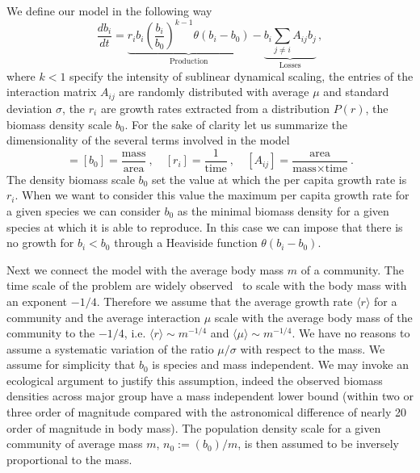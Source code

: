 \documentclass[10pt]{article}
\begin{document}
We define our model in the following way
\begin{equation}
    \frac{d b_i}{dt} = \underbrace{r_ib_i\left(\frac{b_i}{b_0}\right)^{k -1}\theta(b_i-b_0)}_\text{Production}
     - \underbrace{b_i\sum_{j\neq i}A_{ij}b_j}_\text{Losses} \, ,
\end{equation}
where $k<1$
specify the intensity of sublinear dynamical scaling,
the entries of the interaction matrix $A_{ij}$
are randomly distributed with average $\mu$ and standard deviation $\sigma$,
the $r_i$ are growth rates extracted from a distribution
$P(r)$, the biomass density scale
$b_0$.
For the sake of clarity let us summarize the dimensionality of
the several terms involved in the model
\begin{equation}
    [b_i] = [b_0] =  \frac{\textrm{mass}}{\textrm{area}} \ ,
    \quad [r_i]=\frac{1}{\textrm{time}} \ , 
    \quad [A_{ij}]=\frac{\textrm{area}}{\textrm{mass}\times \textrm{time}} \ .
\end{equation}
The density biomass scale $b_0$ set the value at which the per capita
growth rate is $r_i$. When we want to consider this value the
maximum per capita growth rate for a given species we can
consider $b_0$ as the minimal biomass density for a given species
at which it is able to reproduce. 
In this case we can impose that there is no growth
for $b_i<b_0$ through a Heaviside function $\theta(b_i-b_0)$.

Next we connect the model with the average body mass $m$ of a community. 
The time scale of the problem are widely observed~\cite{Hatton2019}
to scale with the body mass with an exponent $-1/4$.
Therefore we assume that the average growth rate $\langle r \rangle$ for
a community and the average interaction $\mu$ scale with the average body mass
of the community to the $-1/4$, 
i.e. $\langle r\rangle\sim m^{-1/4}$ and $\langle \mu \rangle\sim m^{-1/4}$.
We have no reasons to assume a systematic variation of the ratio
$\mu/\sigma$ with respect to the mass.
We assume for simplicity that $b_0$ is species and mass independent. 
We may invoke an ecological argument
to justify this assumption, 
indeed the observed biomass densities across major group
have a mass independent lower bound (within two or three order of magnitude compared
with the astronomical difference of nearly 20 order of magnitude in body mass).
The population density scale for a given community of average mass
$m$, $n_0:=(b_0)/m$, is then assumed to be inversely proportional to the mass.
\end{document}
